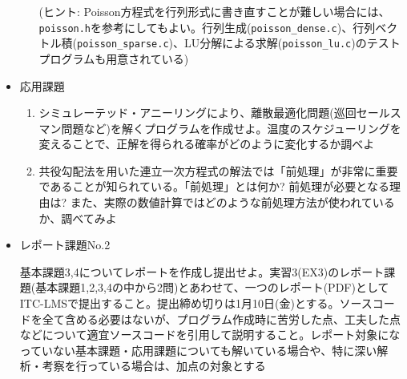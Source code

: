 \documentclass[11pt]{jarticle}
\begin{document}
\begin{itemize}
\begin{enumerate}
    (ヒント: Poisson方程式を行列形式に書き直すことが難しい場合には、{\tt poisson.h}を参考にしてもよい。行列生成({\tt poisson\_dense.c})、行列ベクトル積({\tt poisson\_sparse.c})、LU分解による求解({\tt poisson\_lu.c})のテストプログラムも用意されている)
  \end{enumerate}  
\item 応用課題
  \begin{enumerate}
  \item シミュレーテッド・アニーリングにより、離散最適化問題(巡回セールスマン問題など)を解くプログラムを作成せよ。温度のスケジューリングを変えることで、正解を得られる確率がどのように変化するか調べよ
  \item 共役勾配法を用いた連立一次方程式の解法では「前処理」が非常に重要であることが知られている。「前処理」とは何か? 前処理が必要となる理由は? また、実際の数値計算ではどのような前処理方法が使われているか、調べてみよ
  \end{enumerate}

\item レポート課題No.2

基本課題3,4についてレポートを作成し提出せよ。実習3(EX3)のレポート課題(基本課題1,2,3,4の中から2問)とあわせて、一つのレポート(PDF)としてITC-LMSで提出すること。提出締め切りは1月10日(金)とする。ソースコードを全て含める必要はないが、プログラム作成時に苦労した点、工夫した点などについて適宜ソースコードを引用して説明すること。レポート対象になっていない基本課題・応用課題についても解いている場合や、特に深い解析・考察を行っている場合は、加点の対象とする
\end{itemize}
\end{document}
